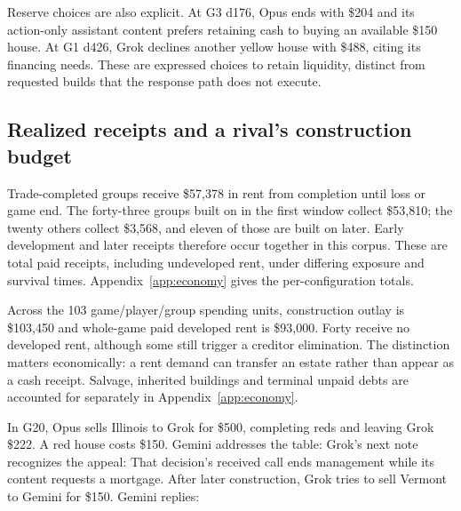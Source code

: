 Reserve choices are also explicit. At G3 d176, Opus ends with \$204 and its action-only assistant content prefers retaining cash to buying an available \$150 house. At G1 d426, Grok declines another yellow house with \$488, citing its financing needs. These are expressed choices to retain liquidity, distinct from requested builds that the response path does not execute.

\subsection{Realized receipts and a rival's construction budget}

Trade-completed groups receive \$57,378 in rent from completion until loss or game end. The forty-three groups built on in the first window collect \$53,810; the twenty others collect \$3,568, and eleven of those are built on later. Early development and later receipts therefore occur together in this corpus. These are total paid receipts, including undeveloped rent, under differing exposure and survival times. Appendix~\ref{app:economy} gives the per-configuration totals.

Across the 103 game/player/group spending units, construction outlay is \$103,450 and whole-game paid developed rent is \$93,000. Forty receive no developed rent, although some still trigger a creditor elimination. The distinction matters economically: a rent demand can transfer an estate rather than appear as a cash receipt. Salvage, inherited buildings and terminal unpaid debts are accounted for separately in Appendix~\ref{app:economy}.


In G20, Opus sells Illinois to Grok for \$500, completing reds and leaving Grok \$222. A red house costs \$150. Gemini addresses the table:
Grok's next note recognizes the appeal:
That decision's received call ends management while its content requests a mortgage. After later construction, Grok tries to sell Vermont to Gemini for \$150. Gemini replies:
\FloatBarrier
